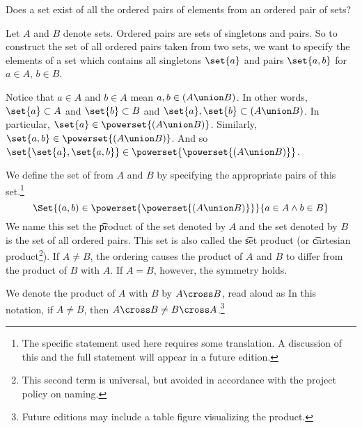 

Does a set exist of all the ordered pairs of elements from an ordered pair of sets?


Let $A$ and $B$ denote sets.
Ordered pairs are sets of singletons and pairs.
So to construct the set of all ordered pairs taken from two sets, we want to specify the elements of a set which contains all singletons $\set{a}$ and pairs $\set{a, b}$ for $a \in A$, $b \in B$.

Notice that $a \in A$ and $b \in A$ mean $a, b \in (A \union B)$.
In other words, $\set{a} \subset A$ and $\set{b} \subset B$ and $\set{a}, \set{b} \subset (A \union B)$.
In particular, $\set{a} \in \powerset{(A \union B)}$.
Similarly, $\set{a, b} \in \powerset{(A \union B)}$.
And so $\set{\set{a}, \set{a, b}} \in \powerset{\powerset{(A \union B)}}$.

We define the set of  from $A$ and $B$ by specifying the appropriate pairs of this set.\footnote{The specific statement used here requires some translation. A discussion of this and the full statement will appear in a future edition.}
\[
  \Set{(a, b) \in \powerset{\powerset{(A \union B)}}}{a \in A \land b \in B}
\]
We name this set the \t{product} of the set denoted by $A$ and the set denoted by $B$ is the set of all ordered pairs.
This set is also called the \t{set product} (or \t{cartesian product}\footnote{This second term is universal, but avoided in accordance with the project policy on naming.}).
If $A \neq B$, the ordering causes the product of $A$ and $B$ to differ from the product of
$B$ with $A$.
If $A = B$, however, the symmetry holds.


We denote the product of $A$ with $B$ by $A \cross B$, read aloud as 
In this notation, if $A \neq B$, then $A \cross B \neq B \cross A$.\footnote{Future editions may include a table figure visualizing the product.}
